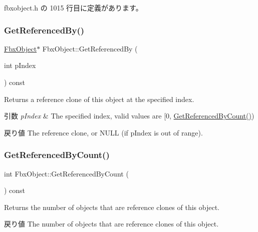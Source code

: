  fbxobject.\+h の 1015 行目に定義があります。

\mbox{\label{class_fbx_object_a09291d887559a590239fedc4e772a4e8}} 
\subsubsection{\texorpdfstring{Get\+Referenced\+By()}{GetReferencedBy()}}
{\footnotesize\ttfamily \hyperlink{class_fbx_object}{Fbx\+Object}$\ast$ Fbx\+Object\+::\+Get\+Referenced\+By (\begin{DoxyParamCaption}\item[{int}]{p\+Index }\end{DoxyParamCaption}) const}

Returns a reference clone of this object at the specified index. 
\begin{DoxyParams}{引数}
{\em p\+Index} & The specified index, valid values are \mbox{[}0, \hyperlink{class_fbx_object_a97318ba302685288321f65144063b7c7}{Get\+Referenced\+By\+Count()}) \\
\hline
\end{DoxyParams}
\begin{DoxyReturn}{戻り値}
The reference clone, or N\+U\+LL (if p\+Index is out of range). 
\end{DoxyReturn}
\mbox{\label{class_fbx_object_a97318ba302685288321f65144063b7c7}} 
\subsubsection{\texorpdfstring{Get\+Referenced\+By\+Count()}{GetReferencedByCount()}}
{\footnotesize\ttfamily int Fbx\+Object\+::\+Get\+Referenced\+By\+Count (\begin{DoxyParamCaption}{ }\end{DoxyParamCaption}) const}

Returns the number of objects that are reference clones of this object. \begin{DoxyReturn}{戻り値}
The number of objects that are reference clones of this object. 
\end{DoxyReturn}
\mbox{\label{class_fbx_object_a1ba2b3e81083122497ab033c642cbfb8}} 
